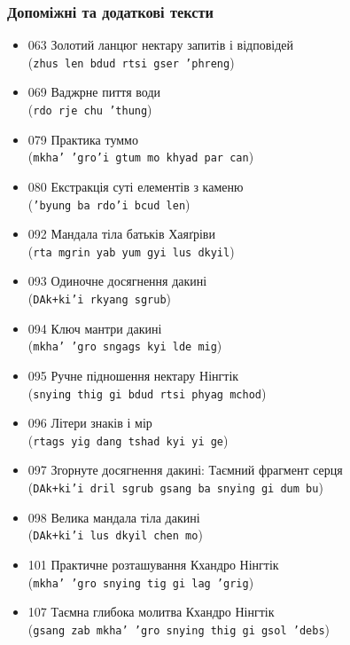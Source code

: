 \documentclass{article}
\begin{document}
\subsubsection{Допоміжні та додаткові тексти}

\begingroup\raggedright
\begin{itemize}
\item 063 Золотий ланцюг нектару запитів і відповідей \\ (\texttt{zhus len bdud rtsi gser 'phreng})
\item 069 Ваджрне пиття води \\ (\texttt{rdo rje chu 'thung})
\item 079 Практика туммо \\ (\texttt{mkha' 'gro'i gtum mo khyad par can})
\item 080 Екстракція суті елементів з каменю \\ (\texttt{'byung ba rdo'i bcud len})
\item 092 Мандала тіла батьків Хаяґріви \\ (\texttt{rta mgrin yab yum gyi lus dkyil})
\item 093 Одиночне досягнення дакині \\ (\texttt{DAk+ki'i rkyang sgrub})
\item 094 Ключ мантри дакині \\ (\texttt{mkha' 'gro sngags kyi lde mig})
\item 095 Ручне підношення нектару Нінгтік \\ (\texttt{snying thig gi bdud rtsi phyag mchod})
\item 096 Літери знаків і мір \\ (\texttt{rtags yig dang tshad kyi yi ge})
\item 097 Згорнуте досягнення дакині: Таємний фрагмент серця \\ (\texttt{DAk+ki'i dril sgrub gsang ba snying gi dum bu})
\item 098 Велика мандала тіла дакині \\ (\texttt{DAk+ki'i lus dkyil chen mo})
\item 101 Практичне розташування Кхандро Нінгтік \\ (\texttt{mkha' 'gro snying tig gi lag 'grig})
\item 107 Таємна глибока молитва Кхандро Нінгтік \\ (\texttt{gsang zab mkha' 'gro snying thig gi gsol 'debs})
\end{itemize}
\endgroup
\end{document}

